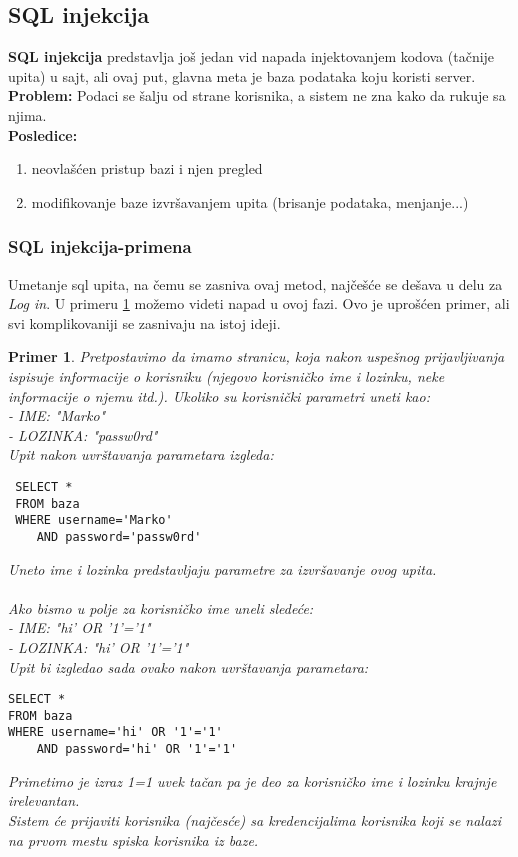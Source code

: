 \documentclass[a4paper]{article}
\newtheorem{primer}{Primer}[section]
\begin{document}
\subsection{SQL injekcija}
\textbf{SQL injekcija} predstavlja jo\v{s} jedan vid napada injektovanjem kodova (ta\v{c}nije upita) u sajt, ali ovaj put, glavna meta je baza podataka koju koristi server.\\
\textbf{Problem:} Podaci se \v{s}alju od strane korisnika, a sistem ne zna kako da rukuje sa njima.\\
\textbf{Posledice:} 
\begin{enumerate}
	\item neovla\v{s}\'{c}en pristup bazi i njen pregled
	\item modifikovanje baze izvr\v{s}avanjem upita (brisanje podataka, menjanje...)
\end{enumerate}
\subsubsection{SQL injekcija-primena}
Umetanje sql upita, na \v{c}emu se zasniva ovaj metod, naj\v{c}e\v{s}\'{c}e se de\v{s}ava u delu za \textit{Log in}. U primeru \ref{primer2} možemo videti napad u ovoj fazi. Ovo je upro\v{s}\'{c}en primer, ali svi komplikovaniji se zasnivaju na istoj ideji.
\begin{primer}
\label{primer2}
Pretpostavimo da imamo stranicu, koja nakon uspe\v{s}nog prijavljivanja ispisuje informacije o korisniku (njegovo korisni\v{c}ko ime i lozinku, neke informacije o njemu itd.). Ukoliko su korisnički parametri uneti kao:\\
- IME: "Marko"\\
- LOZINKA: "passw0rd"\\
Upit nakon uvrštavanja parametara izgleda:
\begin{lstlisting}
 SELECT * 
 FROM baza 
 WHERE username='Marko'
 	AND password='passw0rd'
\end{lstlisting}
Uneto ime i lozinka predstavljaju parametre za izvr\v{s}avanje ovog upita.\\\\
Ako bismo u polje za korisni\v{c}ko ime uneli slede\'{c}e:\\
- IME: "hi' OR '1'='1"\\
- LOZINKA: "hi' OR '1'='1"\\
Upit bi izgledao sada ovako nakon uvrštavanja parametara:
\begin{lstlisting}
SELECT * 
FROM baza 
WHERE username='hi' OR '1'='1' 
	AND password='hi' OR '1'='1'
\end{lstlisting}
Primetimo je izraz 1=1 uvek ta\v{c}an pa je deo za korisni\v{c}ko ime i lozinku krajnje irelevantan.\\
Sistem \'{c}e prijaviti korisnika (naj\v{c}es\'{c}e) sa kredencijalima korisnika koji se nalazi na prvom mestu spiska korisnika iz baze.\\
\end{primer}
\end{document}

